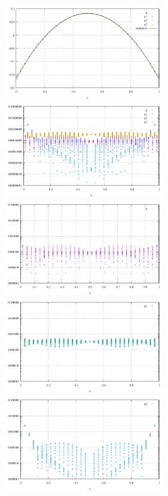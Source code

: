 \begin{center}
\includegraphics[width=7cm]{python_codes/fieldstone_12/results/reg/pressure}
\includegraphics[width=7cm]{python_codes/fieldstone_12/results/reg/pressure_error}\\
\includegraphics[width=7cm]{python_codes/fieldstone_12/results/reg/p_error}
\includegraphics[width=7cm]{python_codes/fieldstone_12/results/reg/q1_error}\\
\includegraphics[width=7cm]{python_codes/fieldstone_12/results/reg/q2_error}

\end{center}
